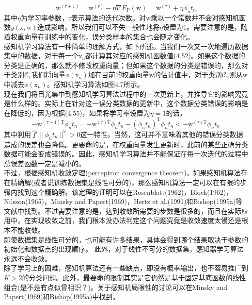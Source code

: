 \documentclass[b5paper]{book}
\numberwithin{equation}{chapter}
\newcommand {\bx} {\boldsymbol{\mathrm{x}}}
\newcommand {\bw} {\boldsymbol{\mathrm{w}}}
\newcommand {\rmT} {\mathrm{T}}
\begin{document}
{	\begin{equation}
		\bw^{(\tau+1)} = \bw^{(\tau)} - \eta \nabla E_\mathrm{P}(\bw) = \bw^{(\tau)}+\eta \phi_n t_n
	\end{equation}
	其中$\eta$为学习率参数，$\tau$表示算法的迭代次数。对$\bw$乘以一个常数并不会对感知机函数$y(\bx, \bw)$造成影响，所以我们可以不失一般性地将$\eta$设置为1。需要注意的是，随着权重向量在训练中的变化，误分类样本的集合也会随之变化。\\
	\indent 感知机学习算法有一种简单的理解方式，如下所述。当我们一次又一次地遍历数据集中的数据，对于每一个$\bx_n$都计算其对应的感知机函数值(4.52)。如果这个数据的分类是正确的，那么就不修改权重向量；但如果这个数据的分类是错误的，那么对于类别$\mathcal{C}_1$我们将向量$\phi(\bx_n)$加在目前的权重向量$\bw$的估计值中，对于类别$\mathcal{C}_2$则从$\bw$中减去$\phi(\bx_n)$。感知机学习算法如图4.7所示。\\
	\indent 现在我们将目光集中到感知机学习算法过程中的一次更新上，并推导它的影响究竟是什么样的。实际上在针对这一误分类数据的更新中，这个数据分类错误的影响是在降低的，因为根据(4.55)，如果将学习率设置为$\eta = 1$的话，
	\begin{equation}
		-\bw^{(\tau+1)\rmT}\phi_n t_n = -\bw^{(\tau) \rmT} \phi_n t_n - (\phi_n t_n)^{\rmT} \phi_n t_n < -\bw^{(\tau)\rmT}\phi_n t_n
	\end{equation}
	其中利用了$\|\phi_n t_n\|^2 >0$这一特性。当然，这可并不意味着其他的错误分类数据造成的误差也会降低。更要命的是，在权重向量发生更新时，此前的某些正确分类数据可能会变成错误的。因此，感知机学习算法并不能保证在每一次迭代的过程中总误差函数一定是减小的。\\
	\indent 不过，根据感知机收敛定理(perceptron convergence theorem)，如果感知机算法存在精确解(或者说训练数据集是线性可分的)，那么感知机算法一定可以在有限的步骤内找到这个精确解。该定理的证明可以在Rosenblatt(1962)，Block(1962)，Nilsson(1965)，Minsky and Papert(1969)，Hertz et al.(1991)和Bishop(1995a)等文献中找到。不过需要注意的是，达到收敛所需要的步数是很多的，而且在实际应用中，在实现收敛之前，我们根本没办法判定这个问题究竟是收敛速度太慢还是根本不能收敛。\\
	\indent 即使数据集是线性可分的，也可能有许多结果，具体会得到哪个结果取决于参数的初始化和数据点的出现顺序。 此外，对于线性不可分的数据集，感知器学习算法永远不会收敛。\\
	\indent 除了学习上的困难，感知机算法还有一些缺点，即没有概率输出，也不容易推广到$K>2$的分类问题。此外，最要命的限制其实是它仍然是基于固定基底函数的线性组合(是不是有点似曾相识？)。关于感知机局限性的讨论可以在Minsky and Papert(1969)和Bishop(1995a)中找到。\\
}
\end{document}
